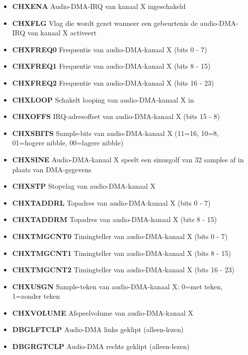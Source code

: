 \begin{itemize}
\item{\bf{CHXENA}} Audio-DMA-IRQ van kanaal X ingeschakeld
\item{\bf{CHXFLG}} Vlag die wordt gezet wanneer een gebeurtenis de audio-DMA-IRQ van kanaal X activeert
\item{\bf{CHXFREQ0}} Frequentie van audio-DMA-kanaal X (bits 0 - 7)
\item{\bf{CHXFREQ1}} Frequentie van audio-DMA-kanaal X (bits 8 - 15)
\item{\bf{CHXFREQ2}} Frequentie van audio-DMA-kanaal X (bits 16 - 23)
\item{\bf{CHXLOOP}} Schakelt looping van audio-DMA-kanaal X in
\item{\bf{CHXOFFS}} IRQ-adresoffset van audio-DMA-kanaal X (bits 15 - 8)
\item{\bf{CHXSBITS}} Sample-bits van audio-DMA-kanaal X (11=16, 10=8, 01=hogere nibble, 00=lagere nibble)
\item{\bf{CHXSINE}} Audio-DMA-kanaal X speelt een sinusgolf van 32 samples af in plaats van DMA-gegevens
\item{\bf{CHXSTP}} Stopvlag van audio-DMA-kanaal X
\item{\bf{CHXTADDRL}} Topadres van audio-DMA-kanaal X (bits 0 - 7)
\item{\bf{CHXTADDRM}} Topadres van audio-DMA-kanaal X (bits 8 - 15)
\item{\bf{CHXTMGCNT0}} Timingteller van audio-DMA-kanaal X (bits 0 - 7)
\item{\bf{CHXTMGCNT1}} Timingteller van audio-DMA-kanaal X (bits 8 - 15)
\item{\bf{CHXTMGCNT2}} Timingteller van audio-DMA-kanaal X (bits 16 - 23)
\item{\bf{CHXUSGN}} Sample-teken van audio-DMA-kanaal X: 0=met teken, 1=zonder teken
\item{\bf{CHXVOLUME}} Afspeelvolume van audio-DMA-kanaal X
\item{\bf{DBGLFTCLP}} Audio-DMA links geklipt (alleen-lezen)
\item{\bf{DBGRGTCLP}} Audio-DMA rechts geklipt (alleen-lezen)

\end{itemize}
